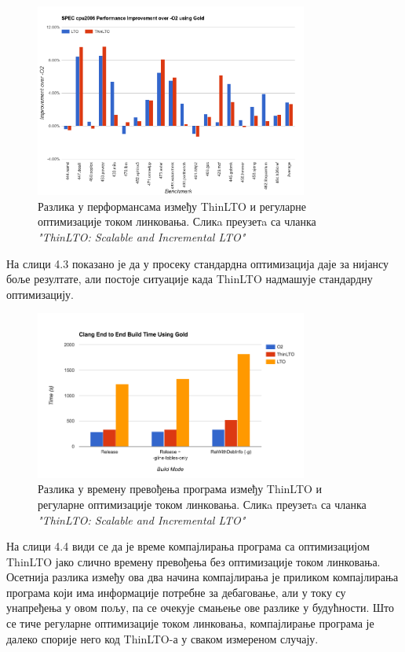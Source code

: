 \documentclass[12pt,oneside]{memoir}
\begin{document}
\begin{figure}[!ht]
  \centering
  \includegraphics[width=0.8\textwidth]{thin_perfomance.png}
  \caption{Разлика у перформансама између ThinLTO и регуларне оптимизације током линковања. Сликa преузетa са чланка \textit{"ThinLTO: Scalable and Incremental LTO"}}
 
  \label{fig:grafikon}
\end{figure}

На слици 4.3 показано је да у просеку стандардна оптимизација даје за нијансу
боље резултате, али постоје ситуације када ThinLTO надмашује стандардну оптимизацију.


\begin{figure}[!ht]
  \centering
  \includegraphics[width=0.8\textwidth]{build_time.png}
  \caption{Разлика у времену превођења програма
   између ThinLTO и регуларне оптимизације током линковања. Сликa преузетa са чланка \textit{"ThinLTO: Scalable and Incremental LTO"}}
  \label{fig:grafikon}
\end{figure}

На слици 4.4 види се да је време компајлирања програма са оптимизацијом ThinLTO
јако слично времену превођења без оптимизације током линковања.
Осетнија разлика између ова два начина компајлирања је приликом компајлирања
програма који има информације потребне за дебаговање, али у току су унапређења
у овом пољу, па се очекује смањење ове разлике у будућности.
Што се тиче регуларне оптимизације током линковања, компајлирање програма
је далеко спорије него код ThinLTO-а у сваком измереном случају.
 
\end{document}
